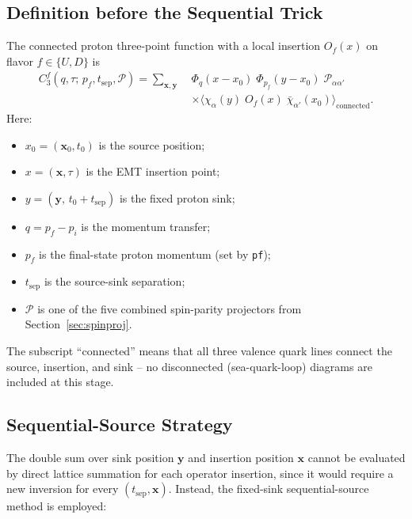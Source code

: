 \documentclass[11pt,a4paper]{article}
\newcommand{\PolProj}{\mathcal{P}}
\newcommand{\xsrc}{x_{0}}
\newcommand{\xsink}{y}
\newcommand{\xins}{x}
\newcommand{\pfinal}{p_{f}}
\newcommand{\pini}{p_{i}}
\newcommand{\momtrans}{q}
\begin{document}
\subsection{Definition before the Sequential Trick}
\label{sec:C3_def}

The connected proton three-point function with a local insertion $O_{f}(x)$ on
flavor $f \in \{U,D\}$ is
\begin{equation}
  \boxed{
  \begin{aligned}
  C_{3}^{f}(\momtrans,\tau;\,\pfinal,t_{\text{sep}},\PolProj)
  = \sum_{\mathbf{x},\mathbf{y}}\;
    &\Phi_{\momtrans}(\xins-\xsrc)\;
    \Phi_{\pfinal}(\xsink-\xsrc)\;
    \PolProj_{\alpha\alpha'}\\
    &\times\big\langle
        \chi_{\alpha}(\xsink)\;
        O_{f}(\xins)\;
        \bar{\chi}_{\alpha'}(\xsrc)
      \big\rangle_{\text{connected}}.
  \end{aligned}
  }
  \label{eq:C3_def}
\end{equation}
Here:
\begin{itemize}
  \item $\xsrc = (\mathbf{x}_{0},t_{0})$ is the source position;
  \item $\xins = (\mathbf{x},\tau)$ is the EMT insertion point;
  \item $\xsink = (\mathbf{y},\,t_{0}+t_{\text{sep}})$ is the fixed proton sink;
  \item $\momtrans = \pfinal - \pini$ is the momentum transfer;
  \item $\pfinal$ is the final-state proton momentum (set by \texttt{pf});
  \item $t_{\text{sep}}$ is the source-sink separation;
  \item $\PolProj$ is one of the five combined spin-parity projectors from
        Section~\ref{sec:spinproj}.
\end{itemize}
The subscript ``connected'' means that all three valence quark lines connect the
source, insertion, and sink -- no disconnected (sea-quark-loop) diagrams are
included at this stage.

\subsection{Sequential-Source Strategy}

The double sum over sink position $\mathbf{y}$ and insertion position $\mathbf{x}$
cannot be evaluated by direct lattice summation for each operator insertion, since
it would require a new inversion for every $(t_{\text{sep}}, \mathbf{x})$.
Instead, the fixed-sink sequential-source method is employed:
\end{document}
